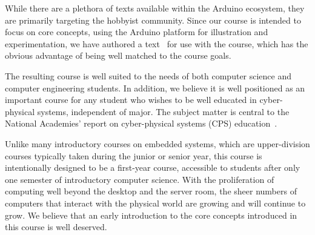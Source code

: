 While there are a plethora of texts available within the Arduino
ecosystem, they are primarily targeting the hobbyist community. Since
our course is intended to focus on core concepts, using the
Arduino platform for illustration and experimentation, we have authored
a text~\cite{cc17} for use with the course, which has the obvious
advantage of being well matched to the course goals.

The resulting course is well suited to the needs of
both computer science and computer engineering students.
In addition, we believe it is well positioned as an important course for
any student who wishes to be well educated in cyber-physical systems,
independent of major.
The subject matter is central to the National Academies' report on
cyber-physical systems (CPS) education~\cite{nasem16}.

Unlike many introductory courses on embedded systems, which are upper-division
courses typically taken during the junior or senior year, this course is
intentionally
designed to be a first-year course, accessible to students after only
one semester of introductory computer science.  With the proliferation of
computing well beyond the desktop and the server room, the sheer numbers
of computers that interact with the physical world are growing and
will continue to grow.
We believe that an early introduction to the core concepts
introduced in this course is well deserved.

